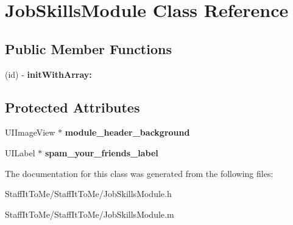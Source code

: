 \hypertarget{interface_job_skills_module}{
\section{\-Job\-Skills\-Module \-Class \-Reference}
\label{interface_job_skills_module}
}
\subsection*{\-Public \-Member \-Functions}
\begin{DoxyCompactItemize}
\item 
\hypertarget{interface_job_skills_module_a1b694c14a337ce8e56c08234c1eb1e87}{
(id) -\/ {\bfseries init\-With\-Array\-:}}
\label{interface_job_skills_module_a1b694c14a337ce8e56c08234c1eb1e87}

\end{DoxyCompactItemize}
\subsection*{\-Protected \-Attributes}
\begin{DoxyCompactItemize}
\item 
\hypertarget{interface_job_skills_module_a334e2d5fc96ea05263ee8d91652e5384}{
\-U\-I\-Image\-View $\ast$ {\bfseries module\-\_\-header\-\_\-background}}
\label{interface_job_skills_module_a334e2d5fc96ea05263ee8d91652e5384}

\item 
\hypertarget{interface_job_skills_module_a3923efc309293646dd60ea2da3548414}{
\-U\-I\-Label $\ast$ {\bfseries spam\-\_\-your\-\_\-friends\-\_\-label}}
\label{interface_job_skills_module_a3923efc309293646dd60ea2da3548414}

\end{DoxyCompactItemize}


\-The documentation for this class was generated from the following files\-:\begin{DoxyCompactItemize}
\item 
\-Staff\-It\-To\-Me/\-Staff\-It\-To\-Me/\-Job\-Skills\-Module.\-h\item 
\-Staff\-It\-To\-Me/\-Staff\-It\-To\-Me/\-Job\-Skills\-Module.\-m\end{DoxyCompactItemize}
